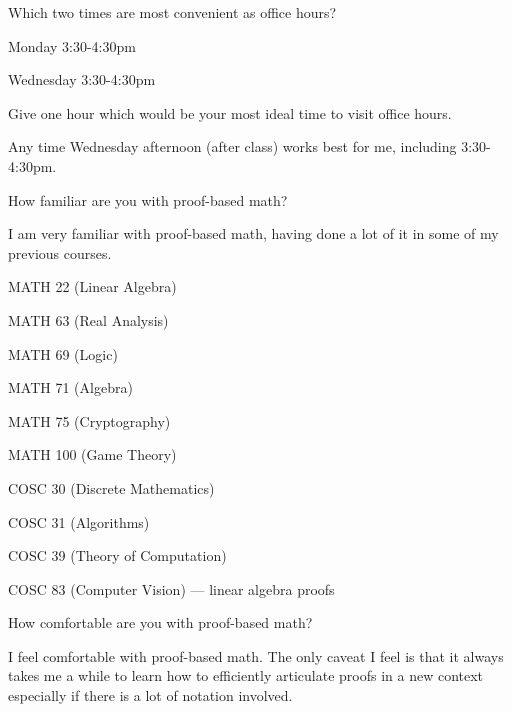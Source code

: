 \begin{problem}
  Which two times are most convenient as office hours?
  \begin{answer}
    \begin{enumarabic}
      \item Monday 3:30-4:30pm
      \item Wednesday 3:30-4:30pm
    \end{enumarabic}
  \end{answer}
\end{problem}


\begin{problem}
  Give one hour which would be your most ideal time to visit office hours.
  \begin{answer}
    Any time Wednesday afternoon (after class) works best for me,
    including 3:30-4:30pm.
  \end{answer}
\end{problem}

\begin{problem}
  How familiar are you with proof-based math?
  \begin{answer}
    I am very familiar with proof-based math, having done
    a lot of it in some of my previous courses.
    \begin{enumarabic}
      \item MATH 22 (Linear Algebra)
      \item MATH 63 (Real Analysis)
      \item MATH 69 (Logic)
      \item MATH 71 (Algebra)
      \item MATH 75 (Cryptography)
      \item MATH 100 (Game Theory)
      \item COSC 30 (Discrete Mathematics)
      \item COSC 31 (Algorithms)
      \item COSC 39 (Theory of Computation)
      \item COSC 83 (Computer Vision) --- linear algebra proofs
    \end{enumarabic}
  \end{answer}
\end{problem}

\newpage
\begin{problem}
  How comfortable are you with proof-based math?
  \begin{answer}
    I feel comfortable with proof-based math.
    The only caveat I feel is that it always takes me a while
    to learn how to efficiently articulate proofs in a new context
    especially if there is a lot of notation involved.
  \end{answer}
\end{problem}


